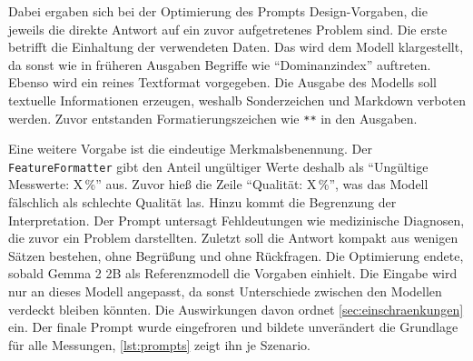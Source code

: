 \noindent Dabei ergaben sich bei der Optimierung des Prompts Design-Vorgaben, die jeweils die direkte Antwort auf ein zuvor aufgetretenes Problem sind. Die erste betrifft die Einhaltung der verwendeten Daten. Das wird dem Modell klargestellt, da sonst wie in früheren Ausgaben Begriffe wie \enquote{Dominanzindex} auftreten. Ebenso wird ein reines Textformat vorgegeben. Die Ausgabe des Modells soll textuelle Informationen erzeugen, weshalb Sonderzeichen und Markdown verboten werden. Zuvor entstanden Formatierungszeichen wie \texttt{**} in den Ausgaben.
\vspace{\baselineskip}

\noindent Eine weitere Vorgabe ist die eindeutige Merkmalsbenennung. Der \texttt{FeatureFormatter} gibt den Anteil ungültiger Werte deshalb als \enquote{Ungültige Messwerte: X\,\%} aus. Zuvor hieß die Zeile \enquote{Qualität: X\,\%}, was das Modell fälschlich als schlechte Qualität las. Hinzu kommt die Begrenzung der Interpretation. Der Prompt untersagt Fehldeutungen wie medizinische Diagnosen, die zuvor ein Problem darstellten. Zuletzt soll die Antwort kompakt aus wenigen Sätzen bestehen, ohne Begrüßung und ohne Rückfragen.
Die Optimierung endete, sobald Gemma 2 2B als Referenzmodell die Vorgaben einhielt. Die Eingabe wird nur an dieses Modell angepasst, da sonst Unterschiede zwischen den Modellen verdeckt bleiben könnten. Die Auswirkungen davon ordnet \autoref{sec:einschraenkungen} ein. Der finale Prompt wurde eingefroren und bildete unverändert die Grundlage für alle Messungen, \autoref{lst:prompts} zeigt ihn je Szenario.

